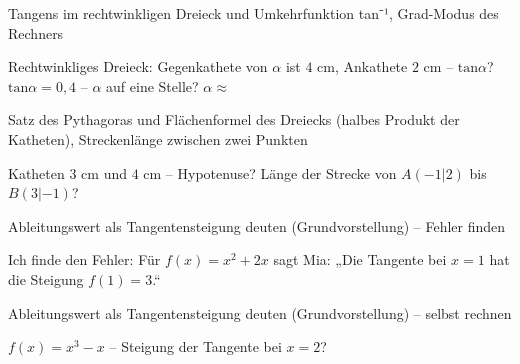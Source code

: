 \begin{aufgabe}{Tangens im rechtwinkligen Dreieck und Umkehrfunktion tan⁻¹, Grad-Modus des Rechners}
\begin{teile}
\teil Rechtwinkliges Dreieck: Gegenkathete von $\alpha$ ist $4$ cm, Ankathete $2$ cm – $\mathrm{tan}\alpha$? \leerfeld
\teil $\mathrm{tan}\alpha = 0{,}4$ – $\alpha$ auf eine Stelle? $\alpha \approx$ \leerfeld[°]
\end{teile}
\end{aufgabe}

\begin{aufgabe}{Satz des Pythagoras und Flächenformel des Dreiecks (halbes Produkt der Katheten), Streckenlänge zwischen zwei Punkten}
\begin{teile}
\teil Katheten $3$ cm und $4$ cm – Hypotenuse? \leerfeld[cm]
\teil Länge der Strecke von $A(-1 | 2)$ bis $B(3 | -1)$? \leerfeld
\end{teile}
\end{aufgabe}

\begin{aufgabe}{Ableitungswert als Tangentensteigung deuten (Grundvorstellung) – Fehler finden}
\begin{teile}
\teil Ich finde den Fehler: Für $f(x) = x^2 + 2x$ sagt Mia: „Die Tangente bei $x = 1$ hat die Steigung $f(1) = 3$.“
\end{teile}
\end{aufgabe}

\begin{aufgabe}{Ableitungswert als Tangentensteigung deuten (Grundvorstellung) – selbst rechnen}
\begin{teile}
\teil $f(x) = x^3 - x$ – Steigung der Tangente bei $x = 2$? \leerfeld
\end{teile}
\end{aufgabe}
